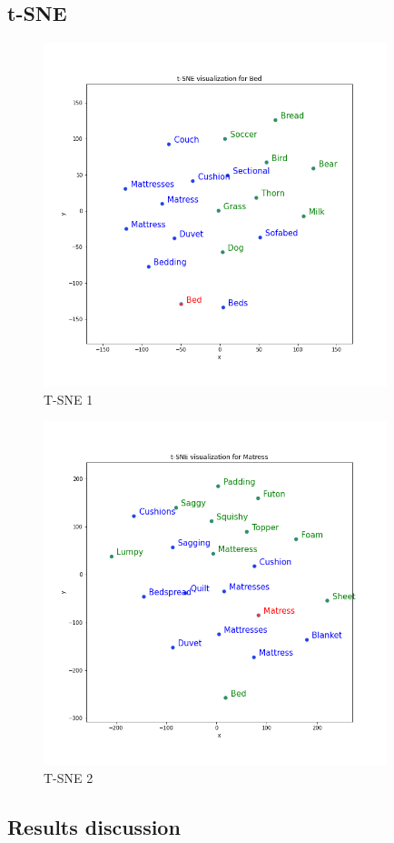 \documentclass[a4paper]{article}    %
\begin{document}
\subsection{t-SNE}

\begin{figure}[H]
    \centering
    \includegraphics[width=10cm]{tsne1}
    \caption{T-SNE 1}
    \label{fig:tsne1}
\end{figure}

\begin{figure}[H]
    \centering
    \includegraphics[width=10cm]{tsne2}
    \caption{T-SNE 2}
    \label{fig:tsne2}
\end{figure}

\subsection{Results discussion}



\end{document}
